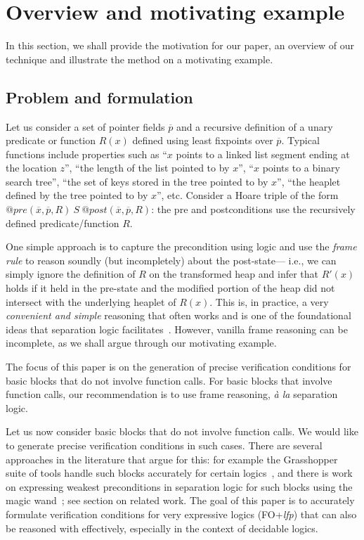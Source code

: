 \documentclass[acmsmall,review,anonymous]{acmart}\settopmatter{printfolios=true,printccs=false,printacmref=false}
\newcommand{\vect}[1]{\overline{#1}}
\begin{document}
\section{Overview and motivating example}
\label{sec:motivation}
In this section, we shall provide the motivation for our paper, an overview of our technique and illustrate the method on a motivating example.


\subsection{Problem and formulation}
Let us consider a set of pointer fields $\vect{p}$ and a recursive definition of a unary predicate or function $R(x)$ defined
using least fixpoints over $\vect{p}$. Typical functions include properties such as 
``$x$ points to a linked list segment ending at the location $z$'', ``the length of the list pointed to by $x$'', 
``$x$ points to a binary search tree'', ``the set of keys stored in the tree pointed to by $x$'', ``the heaplet defined
by the tree pointed to by $x$'', etc.
Consider a Hoare triple of the form $\textit{@pre}(\vect{x}, \vect{p}, R) ~S~ \textit{@post}(\vect{x}, \vect{p}, R)$: the pre and postconditions use the recursively defined predicate/function $R$.

One simple approach is to capture the precondition using logic and use the \emph{frame rule} to reason soundly
(but incompletely) about the post-state--- i.e., we can simply ignore the definition of $R$
on the transformed heap and infer that $R'(x)$ holds if it held in the pre-state and 
the modified portion of the heap did not intersect with the underlying heaplet of $R(x)$.
This is, in practice, a very \emph{convenient and simple} reasoning that often works and is one of the foundational ideas that separation logic facilitates~\cite{Reynolds2002}. However, vanilla frame reasoning can be incomplete, as we shall argue through our motivating example. 

The focus of this paper is on the generation of precise verification conditions for basic blocks that do not involve function calls. For basic blocks that involve function calls, our recommendation is to use frame reasoning, \emph{\`a la} separation logic. 

Let us now consider basic blocks that do not involve function calls. We would like
to generate precise verification conditions in such cases. There are several approaches in the literature that argue for this: for example the Grasshopper suite of tools
handle such blocks accurately for certain logics~\cite{PiskacWiesZufferey2014}, and there is work on expressing weakest preconditions in separation logic for such blocks using the magic wand~\cite{Reynolds2002}; see section on related work. The goal of this paper is to accurately formulate verification conditions for very expressive logics (FO+\textit{lfp}) that can also be reasoned with effectively, especially in the context of decidable logics.
\end{document}
